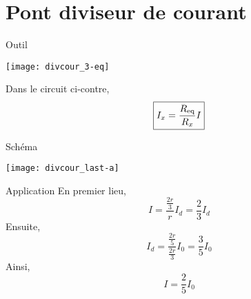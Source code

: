 \documentclass[a4paper, 12pt, final, garamond]{book}
\begin{document}
\section{Pont diviseur de courant}

\begin{NCrapp}[sidebyside]{Outil}
    \begin{center}
        \texttt{[image: divcour\_3-eq]}
    \end{center}
    \tcblower
    \begin{center}
        Dans le circuit ci-contre,
        \[ \boxed{I_x = \frac{R_{\rm eq}}{R_x}I}\]
    \end{center}
\end{NCrapp}
\begin{NCdefi}[]{Schéma}
    \begin{center}
        \texttt{[image: divcour\_last-a]}
    \end{center}
\end{NCdefi}
\begin{NCexem}[]{Application}
    En premier lieu,
    \[ I = \frac{\frac{2r}{3}}{r}I_d = \frac{2}{3}I_d\]
    Ensuite,
    \[ I_d = \frac{ \frac{2r}{5}}{ \frac{2r}{3}}I_0 = \frac{3}{5}I_0\]
    Ainsi,
    \[ \boxed{I = \frac{2}{5}I_0}\]
\end{NCexem}
\end{document}
